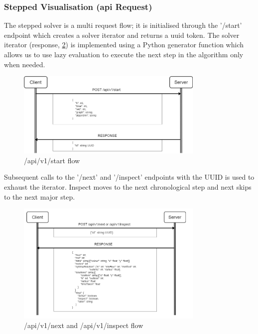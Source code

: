\subsubsection{Stepped Visualisation (\texorpdfstring{\acrshort{api}}{API} Request)}
The stepped solver is a multi request flow; it is initialised through the '/start' endpoint which creates a solver iterator and returns a \acrshort{uuid} token. The solver iterator (response, \cref{fig:stepped_next_inspect_request}) is implemented using a Python generator function which allows us to use lazy evaluation to execute the next step in the algorithm only when needed.
\begin{figure}[H]
    \centering
    \includegraphics[width=0.8\textwidth]{images/stepped_solver_ui/start_stepped_flow.png}
    \caption{/api/v1/start flow}
    \label{fig:stepped_start_request}
\end{figure}

Subsequent calls to the '/next' and '/inspect' endpoints with the UUID is used to exhaust the iterator. Inspect moves to the next chronological step and next skips to the next major step.
\begin{figure}[H]
    \centering
    \includegraphics[width=0.8\textwidth]{images/stepped_solver_ui/next_inspect_stepped_flow.png}
    \caption{/api/v1/next and /api/v1/inspect flow}
    \label{fig:stepped_next_inspect_request}
\end{figure}

%